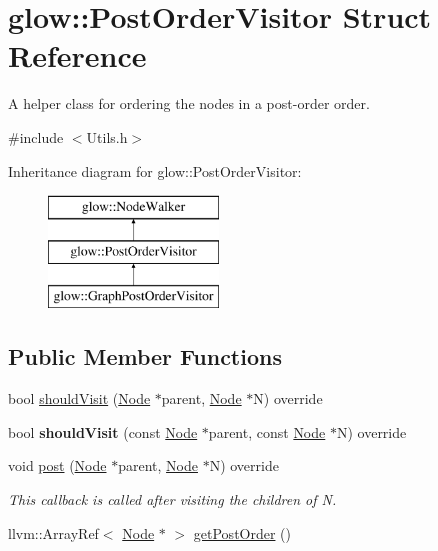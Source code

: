\hypertarget{structglow_1_1_post_order_visitor}{}\section{glow\+:\+:Post\+Order\+Visitor Struct Reference}
\label{structglow_1_1_post_order_visitor}


A helper class for ordering the nodes in a post-\/order order.  




{\ttfamily \#include $<$Utils.\+h$>$}

Inheritance diagram for glow\+:\+:Post\+Order\+Visitor\+:\begin{figure}[H]
\begin{center}
\leavevmode
\includegraphics[height=3.000000cm]{structglow_1_1_post_order_visitor}
\end{center}
\end{figure}
\subsection*{Public Member Functions}
\begin{DoxyCompactItemize}
\item 
bool \hyperlink{structglow_1_1_post_order_visitor_aac9bad1f6f91fb1f9328061e4a4fce68}{should\+Visit} (\hyperlink{classglow_1_1_node}{Node} $\ast$parent, \hyperlink{classglow_1_1_node}{Node} $\ast$N) override
\item 
\mbox{\label{structglow_1_1_post_order_visitor_afca53631a4fa01a286a5fd37d3f15865}} 
bool {\bfseries should\+Visit} (const \hyperlink{classglow_1_1_node}{Node} $\ast$parent, const \hyperlink{classglow_1_1_node}{Node} $\ast$N) override
\item 
\mbox{\label{structglow_1_1_post_order_visitor_acb0712acf8e73438613802a4c963a74f}} 
void \hyperlink{structglow_1_1_post_order_visitor_acb0712acf8e73438613802a4c963a74f}{post} (\hyperlink{classglow_1_1_node}{Node} $\ast$parent, \hyperlink{classglow_1_1_node}{Node} $\ast$N) override
\begin{DoxyCompactList}\small\item\em This callback is called after visiting the children of {\ttfamily N}. \end{DoxyCompactList}\item 
llvm\+::\+Array\+Ref$<$ \hyperlink{classglow_1_1_node}{Node} $\ast$ $>$ \hyperlink{structglow_1_1_post_order_visitor_a781f079d8c1456522989adae267078fc}{get\+Post\+Order} ()
\end{DoxyCompactItemize}
